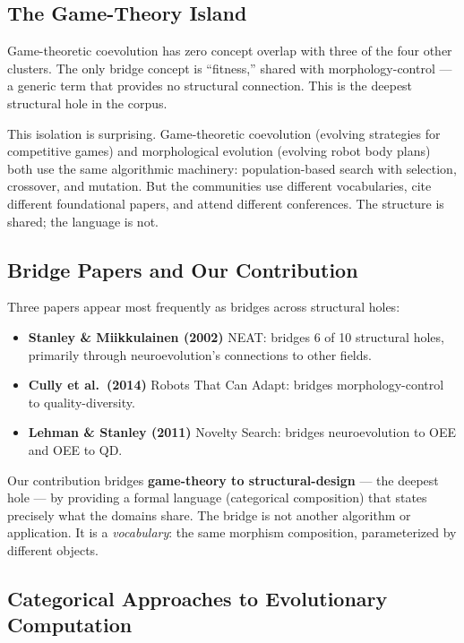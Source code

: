 \documentclass[10pt]{article}
\begin{document}
\subsection{The Game-Theory Island}

Game-theoretic coevolution has zero concept overlap with three of the four other clusters. The only bridge concept is ``fitness,'' shared with morphology-control --- a generic term that provides no structural connection. This is the deepest structural hole in the corpus.

This isolation is surprising. Game-theoretic coevolution (evolving strategies for competitive games) and morphological evolution (evolving robot body plans) both use the same algorithmic machinery: population-based search with selection, crossover, and mutation. But the communities use different vocabularies, cite different foundational papers, and attend different conferences. The structure is shared; the language is not.

\subsection{Bridge Papers and Our Contribution}

Three papers appear most frequently as bridges across structural holes:

\begin{itemize}
  \item \textbf{Stanley \& Miikkulainen (2002)} NEAT: bridges 6 of 10 structural holes, primarily through neuroevolution's connections to other fields.
  \item \textbf{Cully et al.\ (2014)} Robots That Can Adapt: bridges morphology-control to quality-diversity.
  \item \textbf{Lehman \& Stanley (2011)} Novelty Search: bridges neuroevolution to OEE and OEE to QD.
\end{itemize}

Our contribution bridges \textbf{game-theory to structural-design} --- the deepest hole --- by providing a formal language (categorical composition) that states precisely what the domains share. The bridge is not another algorithm or application. It is a \emph{vocabulary}: the same morphism composition, parameterized by different objects.

\subsection{Categorical Approaches to Evolutionary Computation}
\end{document}
